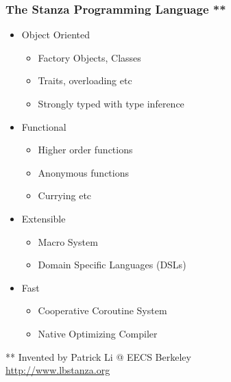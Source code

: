 \documentclass[xcolor=pdflatex,dvipsnames,table]{beamer}
\begin{document}
\begin{frame}[fragile]
\begin{columns}[c]
\end{columns}
\end{frame}

\begin{frame}[fragile]
\frametitle{The Stanza Programming Language **}



\begin{itemize}
\item Object Oriented
\begin{itemize}
\item Factory Objects, Classes
\item Traits, overloading etc
\item Strongly typed with type inference
\end{itemize}
\item Functional
\begin{itemize}
\item Higher order functions
\item Anonymous functions
\item Currying etc
\end{itemize}
\item Extensible
\begin{itemize}
\item Macro System
\item Domain Specific Languages (DSLs)
\end{itemize}
\item Fast
\begin{itemize}
\item Cooperative Coroutine System
\item Native Optimizing Compiler
\end{itemize}
\end{itemize}

** Invented by Patrick Li @ EECS Berkeley \\
\url{http://www.lbstanza.org}



\end{frame}
\end{document}
